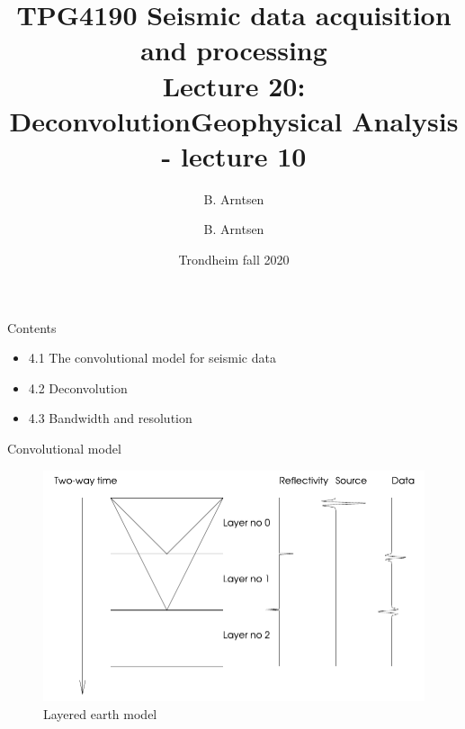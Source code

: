 \documentclass[xcolor=dvipsnames,notes]{beamer}
\begin{document}
\title{TPG4190 Seismic data acquisition and processing \\
               Lecture 20: Deconvolution}
\author{B. Arntsen}
\date{Trondheim fall 2020}
\begin{frame}
 \titlepage
\end{frame}
%

\title{Geophysical Analysis - lecture 10} 
\author{B. Arntsen}
\begin{frame}
 \titlepage
\end{frame}
\begin{frame}{Contents}
\sf\Large
\begin{itemize}
  \item 4.1 The convolutional model for seismic data
  \item 4.2 Deconvolution
  \item 4.3 Bandwidth and resolution
\end{itemize}
\end{frame}
%
\begin{frame}{Convolutional model}
\begin{figure}
\includegraphics[width=\textwidth]{Fig/layers.pdf}
\caption{Layered earth model}
\end{figure}
\end{frame}
\end{document}
